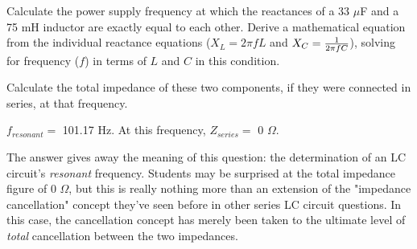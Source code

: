 

Calculate the power supply frequency at which the reactances of a 33 $\mu$F and a 75 mH inductor are exactly equal to each other.  Derive a mathematical equation from the individual reactance equations ($X_L = 2 \pi f L$ and $X_C = {1 \over {2 \pi f C}}$), solving for frequency ($f$) in terms of $L$ and $C$ in this condition.

Calculate the total impedance of these two components, if they were connected in series, at that frequency.







$f_{resonant} =$ 101.17 Hz.  At this frequency, $Z_{series} =$ 0 $\Omega$.







The answer gives away the meaning of this question: the determination of an LC circuit's {\it resonant} frequency.  Students may be surprised at the total impedance figure of 0 $\Omega$, but this is really nothing more than an extension of the "impedance cancellation" concept they've seen before in other series LC circuit questions.  In this case, the cancellation concept has merely been taken to the ultimate level of {\it total} cancellation between the two impedances.



